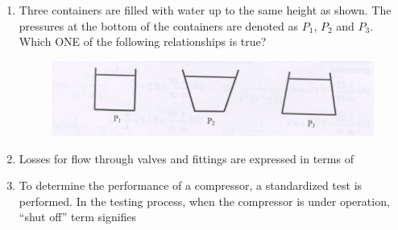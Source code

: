 \documentclass[journal,12pt,onecolumn]{IEEEtran}
\theoremstyle{remark}
\begin{document}
\begin{enumerate}
    \item Three containers are filled with water up to the same height as shown. The pressures at the bottom of the containers are denoted as $P_1$, $P_2$ and $P_3$. Which ONE of the following relationships is true?
    \begin{figure}[H]
        \centering
        \includegraphics[width=0.5\linewidth]{figs/qn9.jpg}
        \caption{}
        \label{fig:qn9.jpg}
    \end{figure}
    \hfill{}
    \begin{enumerate}[label=(\Alph*)]
    \end{enumerate}

    \item Losses for flow through valves and fittings are expressed in terms of
    \hfill{}
    \begin{enumerate}[label=(\Alph*)]
    \end{enumerate}

    \item To determine the performance of a compressor, a standardized test is performed. In the testing process, when the compressor is under operation, ``shut off'' term signifies
    \hfill{}
    \begin{enumerate}[label=(\Alph*)]
    \end{enumerate}


\end{enumerate}
\end{document}
